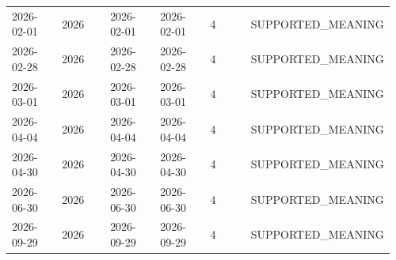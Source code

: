 \begin{longtable}{P{0.1600\linewidth}P{0.1600\linewidth}P{0.1600\linewidth}P{0.1600\linewidth}P{0.1600\linewidth}P{0.1600\linewidth}}
2026-02-01 & 2026 & 2026-02-01 & 2026-02-01 & 4 & SUPPORTED\_MEANING \\
2026-02-28 & 2026 & 2026-02-28 & 2026-02-28 & 4 & SUPPORTED\_MEANING \\
2026-03-01 & 2026 & 2026-03-01 & 2026-03-01 & 4 & SUPPORTED\_MEANING \\
2026-04-04 & 2026 & 2026-04-04 & 2026-04-04 & 4 & SUPPORTED\_MEANING \\
2026-04-30 & 2026 & 2026-04-30 & 2026-04-30 & 4 & SUPPORTED\_MEANING \\
2026-06-30 & 2026 & 2026-06-30 & 2026-06-30 & 4 & SUPPORTED\_MEANING \\
2026-09-29 & 2026 & 2026-09-29 & 2026-09-29 & 4 & SUPPORTED\_MEANING \\
\bottomrule
\end{longtable}
\endgroup
